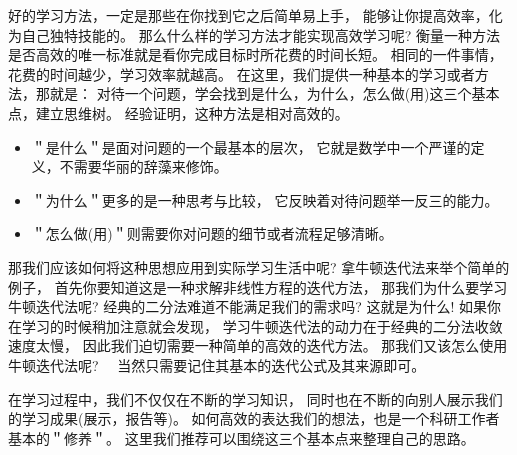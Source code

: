 
好的学习方法，一定是那些在你找到它之后简单易上手，
能够让你提高效率，化为自己独特技能的。
那么什么样的学习方法才能实现高效学习呢?
衡量一种方法是否高效的唯一标准就是看你完成目标时所花费的时间长短。
相同的一件事情，花费的时间越少，学习效率就越高。
在这里，我们提供一种基本的学习或者方法，那就是：
对待一个问题，学会找到是什么，为什么，怎么做(用)这三个基本点，建立思维树。
经验证明，这种方法是相对高效的。

\begin{itemize}
\item ＂是什么＂是面对问题的一个最基本的层次，
  它就是数学中一个严谨的定义，不需要华丽的辞藻来修饰。
\item ＂为什么＂更多的是一种思考与比较，
  它反映着对待问题举一反三的能力。
\item ＂怎么做(用)＂则需要你对问题的细节或者流程足够清晰。
\end{itemize}

那我们应该如何将这种思想应用到实际学习生活中呢? 
拿牛顿迭代法来举个简单的例子，
首先你要知道这是一种求解非线性方程的迭代方法，
那我们为什么要学习牛顿迭代法呢? 
经典的二分法难道不能满足我们的需求吗?
这就是为什么!
如果你在学习的时候稍加注意就会发现，
学习牛顿迭代法的动力在于经典的二分法收敛速度太慢，
因此我们迫切需要一种简单的高效的迭代方法。
那我们又该怎么使用牛顿迭代法呢?　
当然只需要记住其基本的迭代公式及其来源即可。

\begin{remark}
  在学习过程中，我们不仅仅在不断的学习知识，
  同时也在不断的向别人展示我们的学习成果(展示，报告等)。
  如何高效的表达我们的想法，也是一个科研工作者基本的＂修养＂。
  这里我们推荐可以围绕这三个基本点来整理自己的思路。
\end{remark}


